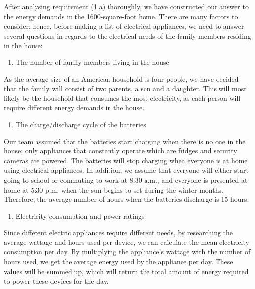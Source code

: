 After analysing requirement (1.a) thoroughly, we have constructed our answer to the energy demands in the 1600-square-foot home. There are many factors to consider; hence, before making a list of electrical appliances, we need to answer several questions in regards to the electrical needs of the family members residing in the house:
\begin{enumerate}
    \item The number of family members living in the house
\end{enumerate}
As the average size of an American household is four people, we have decided that the family will consist of two parents, a son and a daughter. This will most likely be the household that consumes the most electricity, as each person will require different energy demands in the house.
\begin{enumerate}[resume]
    \item The charge/discharge cycle of the batteries
\end{enumerate}
Our team assumed that the batteries start charging when there is no one in the house; only appliances that constantly operate which are fridges and security cameras are powered. The batteries will stop charging when everyone is at home using electrical appliances. In addition, we assume that everyone will either start going to school or commuting to work at 8:30 a.m., and everyone is presented at home at 5:30 p.m. when the sun begins to set during the winter months. Therefore, the average number of hours when the batteries discharge is 15 hours.
\begin{enumerate}[resume]
    \item Electricity consumption and power ratings
\end{enumerate}
Since different electric appliances require different needs, by researching the average wattage and hours used per device, we can calculate the mean electricity consumption per day. By multiplying the appliance's wattage with the number of hours used, we get the average energy used by the appliance per day. These values will be summed up, which will return the total amount of energy required to power these devices for the day.